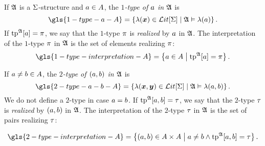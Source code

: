 If $\mathfrak{A}$ is a $\mathrm{\Sigma}$-structure and $a \in A$, the
\emph{$1$-type of $a$ in $\mathfrak{A}$} is
\[
  \gls{1-type-a-A} = \setbd{\litl(\xx) \in \LitF\SigS}{\StrA \vDash \litl(\ea)}.
\]
If $\operatorname{tp}^{\mathfrak{A}}[a] = \pi$, we say that the $1$-type $\pi$ is \emph{realized}
by $a$ in $\mathfrak{A}$. The interpretation of the $1$-type $\pi$ in $\mathfrak{A}$ is
the set of elements realizing $\pi$:
\[
  \gls{1-type-interpretation-A} = \setbd{\ea \in \domA}{\tpIa\StrA\ea = \tpIp}.
\]

If $a \neq b \in A$, the \emph{$2$-type of $(a, b)$ in $\mathfrak{A}$} is
\[
  \gls{2-type-a-b-A} = \setbd{\litl(\xx,\yy) \in \LitF\SigS}{\StrA \vDash
  \litl(\ea, \eb)}.
\]
We do not define a $2$-type in case $a = b$.
If $\operatorname{tp}^{\mathfrak{A}}[a,b] = \tau$, we say that the $2$-type $\tau$ is
\emph{realized} by $(a, b)$ in $\mathfrak{A}$. The interpretation of the $2$-type
$\tau$ in $\mathfrak{A}$ is the set of pairs realizing $\tau$:

\[
  \gls{2-type-interpretation-A} = \setbd{(\ea, \eb) \in
  \domA\cprod\domA}{\ea \neq \eb \land \tpIab\StrA\ea\eb = \tpTt}.
\]